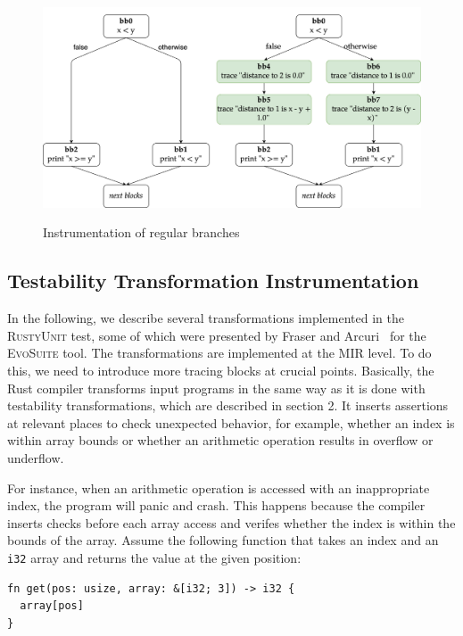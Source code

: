 \documentclass[paper=a4,%
  twoside,%
  BCOR4mm,%
  abstract=true,%
  toc=bibliography,%
  chapterprefix=true,%
  toc=bibliographynumbered,%
  open=right,%
  english,%
  pagesize=pdftex]{scrreprt}
\newcommand{\tech}{\textsc{RustyUnit}\xspace}
\newcommand{\mir}{\ac{MIR}\xspace}
\begin{document}
\begin{figure}[h]
\caption{Instrumentation of regular branches}
\centering
\includegraphics[width=\textwidth]{comparison-instrumented-branch-cfg}
\label{fig:comparison-instrumented-branch-cfg}
\end{figure}

\subsection{Testability Transformation Instrumentation}
\label{sec:mir-testability-transformations}
In the following, we describe several transformations implemented in the \tech test, some of which were presented by Fraser and Arcuri~\cite{Fraser2013} for the \textsc{EvoSuite} tool. The transformations are implemented at the \mir level. To do this, we need to introduce more tracing blocks at crucial points. Basically, the Rust compiler transforms input programs in the same way as it is done with testability transformations, which are described in section 2. It inserts assertions at relevant places to check unexpected behavior, for example, whether an index is within array bounds or whether an arithmetic operation results in overflow or underflow.

For instance, when an arithmetic operation is accessed with an inappropriate index, the program will panic and crash. This happens because the compiler inserts checks before each array access and verifes whether the index is within the bounds of the array. Assume the following function that takes an index and an \texttt{i32} array and returns the value at the given position:
\begin{lstlisting}[style=boxed, caption={}, label=lst:array-index-access-example]
fn get(pos: usize, array: &[i32; 3]) -> i32 {
  array[pos]
}
\end{lstlisting}
\end{document}

